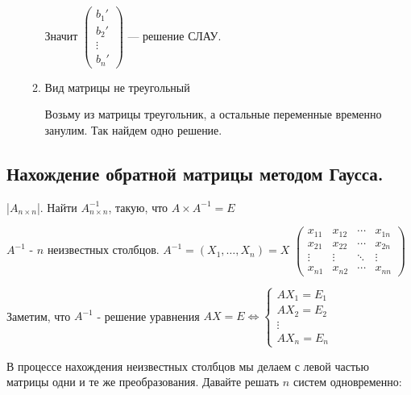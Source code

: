 \documentclass[twoside]{book}
\begin{document}
\begin{enumerate}
\begin{enumerate}
                    Значит \(
                    \begin{pmatrix}
                        b_1'   \\
                        b_2'   \\
                        \vdots \\
                        b_n'
                    \end{pmatrix}
                    \) --- решение СЛАУ.


              \item Вид матрицы не треугольный

                    Возьму из матрицы треугольник, а остальные переменные временно занулим. Так найдем одно решение.
          \end{enumerate}
\end{enumerate}

\subsection{Нахождение обратной матрицы методом Гаусса.}

|\(A_{n \times n}\)|. Найти \(A^{-1}_{n\times n}\), такую, что \(A \times A^{-1} = E\)

\(A^{-1}\) - \(n\) неизвестных столбцов. \(A^{-1} =(X_1,\ldots, X_n) = X\)
\(
\begin{pmatrix}
    x_{11} & x_{12} & \cdots & x_{1n} \\
    x_{21} & x_{22} & \cdots & x_{2n} \\
    \vdots & \vdots & \ddots & \vdots \\
    x_{n1} & x_{n2} & \cdots & x_{nn}
\end{pmatrix}
\)

Заметим, что \(A^{-1}\) - решение уравнения
\(AX = E \Leftrightarrow
\begin{cases}
    AX_1 = E_1 \\
    AX_2 = E_2 \\
    \vdots     \\
    AX_n = E_n
\end{cases}
\)

В процессе нахождения неизвестных столбцов мы делаем с левой частью матрицы одни и те же преобразования. Давайте решать \(n\) систем одновременно:
\end{document}
